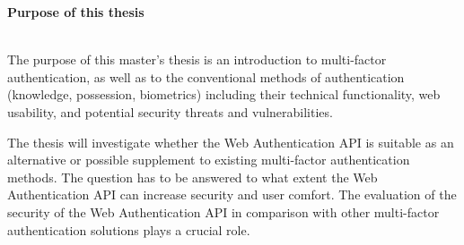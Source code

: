 \thispagestyle{empty}

{}

\begin{large}
	\textbf{Purpose of this thesis} \\ \\
\end{large}

The purpose of this master's thesis is an introduction to multi-factor authentication, as well as to the conventional methods of authentication (knowledge, possession, biometrics) including their technical functionality, web usability, and potential security threats and vulnerabilities.

The thesis will investigate whether the Web Authentication API is suitable as an alternative or possible supplement to existing multi-factor authentication methods. The question has to be answered to what extent the Web Authentication API can increase security and user comfort. The evaluation of the security of the Web Authentication API in comparison with other multi-factor authentication solutions plays a crucial role.

\newpage